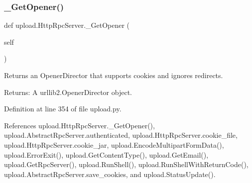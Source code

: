 \subsubsection{\texorpdfstring{\+\_\+\+Get\+Opener()}{\_GetOpener()}\hspace{0.1cm}{\footnotesize\ttfamily [1/2]}}
{\footnotesize\ttfamily def upload.\+Http\+Rpc\+Server.\+\_\+\+Get\+Opener (\begin{DoxyParamCaption}\item[{}]{self }\end{DoxyParamCaption})\hspace{0.3cm}{\ttfamily [private]}}

\begin{DoxyVerb}Returns an OpenerDirector that supports cookies and ignores redirects.

Returns:
  A urllib2.OpenerDirector object.
\end{DoxyVerb}
 

Definition at line 354 of file upload.\+py.



References upload.\+Http\+Rpc\+Server.\+\_\+\+Get\+Opener(), upload.\+Abstract\+Rpc\+Server.\+authenticated, upload.\+Http\+Rpc\+Server.\+cookie\+\_\+file, upload.\+Http\+Rpc\+Server.\+cookie\+\_\+jar, upload.\+Encode\+Multipart\+Form\+Data(), upload.\+Error\+Exit(), upload.\+Get\+Content\+Type(), upload.\+Get\+Email(), upload.\+Get\+Rpc\+Server(), upload.\+Run\+Shell(), upload.\+Run\+Shell\+With\+Return\+Code(), upload.\+Abstract\+Rpc\+Server.\+save\+\_\+cookies, and upload.\+Status\+Update().


